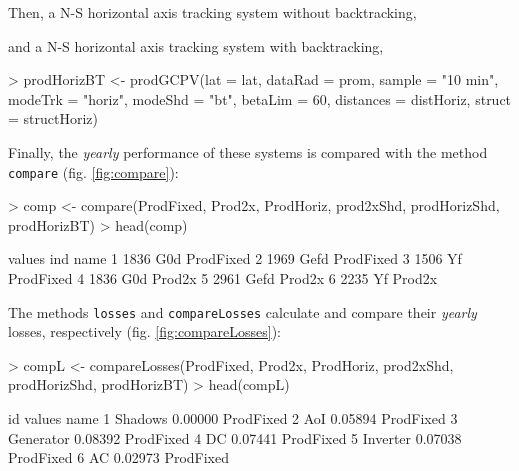 \documentclass[a4paper]{article}
\renewenvironment{Schunk}{\vspace{\topsep}}{\vspace{\topsep}}
\newcommand{\code}[1]{{\texttt{#1}}}
\begin{document}
Then, a N-S horizontal axis tracking system without backtracking, 
\begin{Schunk}
\end{Schunk}

and a N-S horizontal axis tracking system with backtracking, 
\begin{Schunk}
\begin{Sinput}
> prodHorizBT <- prodGCPV(lat = lat, dataRad = prom, sample = "10 min", 
     modeTrk = "horiz", modeShd = "bt", betaLim = 60, distances = distHoriz, 
     struct = structHoriz)
\end{Sinput}
\end{Schunk}

Finally, the \emph{yearly} performance of these systems is compared
with the method \code{compare} (fig. \ref{fig:compare}):
\begin{Schunk}
\begin{Sinput}
> comp <- compare(ProdFixed, Prod2x, ProdHoriz, prod2xShd, 
     prodHorizShd, prodHorizBT)
> head(comp)
\end{Sinput}
\begin{Soutput}
  values  ind      name
1   1836  G0d ProdFixed
2   1969 Gefd ProdFixed
3   1506   Yf ProdFixed
4   1836  G0d    Prod2x
5   2961 Gefd    Prod2x
6   2235   Yf    Prod2x
\end{Soutput}
\end{Schunk}

The methods \code{losses} and \code{compareLosses} calculate and
compare their \emph{yearly} losses, respectively (fig. \ref{fig:compareLosses}):

\begin{Schunk}
\begin{Sinput}
> compL <- compareLosses(ProdFixed, Prod2x, ProdHoriz, prod2xShd, 
     prodHorizShd, prodHorizBT)
> head(compL)
\end{Sinput}
\begin{Soutput}
         id  values      name
1   Shadows 0.00000 ProdFixed
2       AoI 0.05894 ProdFixed
3 Generator 0.08392 ProdFixed
4        DC 0.07441 ProdFixed
5  Inverter 0.07038 ProdFixed
6        AC 0.02973 ProdFixed
\end{Soutput}
\end{Schunk}
\end{document}
